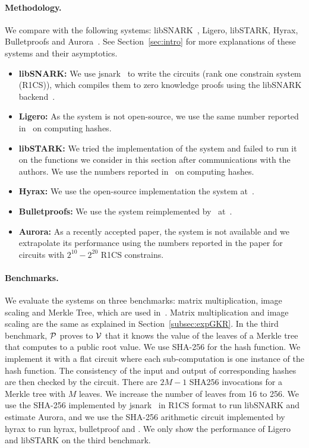 \paragraph{Methodology.} We compare with the following systems: libSNARK~\cite{libsnark}, Ligero\cite{ligero}, libSTARK\cite{libstark}, Hyrax\cite{hyrax},  Bulletproofs\cite{bulletproofs} and Aurora~\cite{}. See Section~\ref{sec:intro} for more explanations of these systems and their asymptotics. 
\begin{itemize}
\item \textbf{libSNARK:} We use jsnark~\cite{jsnark} to write the circuits (rank one constrain system (R1CS)), which compiles them to zero knowledge proofs using the libSNARK backend~\cite{??}. 

\item\textbf{Ligero:} As the system is not open-source, we use the same number reported in~\cite{ligero} on computing hashes.

\item\textbf{libSTARK:} We tried the implementation of the system and failed to run it on the functions we consider in this section after communications with the authors. We use the numbers reported in~\cite{libstark} on computing hashes. 

\item\textbf{Hyrax:} We use the open-source implementation the system at~\cite{??}.

\item\textbf{Bulletproofs:} We use the system reimplemented by~\cite{hyrax} at~\cite{??}.


\item\textbf{Aurora:} As a recently accepted paper, the system is not available and we extrapolate its performance using the numbers reported in the paper for circuits with $2^{10}-2^{20}$ R1CS constrains.

\end{itemize}


\paragraph{Benchmarks.} We evaluate the systems on three benchmarks: matrix multiplication, image scaling and Merkle Tree\cite{merkletree}, which are used in~\cite{hyrax}. Matrix multiplication and image scaling are the same as explained in Section~\ref{subsec:expGKR}. In the third benchmark, $\P$ proves to $\V$ that it knows the value of the leaves of a Merkle tree\cite{merkletree} that computes to a public root value\cite{blum1994checking}. We use SHA-256 for the hash function. We implement it with a flat circuit where each sub-computation is one instance of the hash function. The consistency of the input and output of corresponding hashes are then checked by the circuit. There are $2M - 1$ SHA256 invocations for a Merkle tree with $M$ leaves. We increase the number of leaves from 16 to 256. We use the SHA-256 implemented by jsnark~\cite{jsnark} in R1CS format to run libSNARK and estimate Aurora, and we use the SHA-256 arithmetic circuit implemented by hyrax to run hyrax, bulletproof and \name. We only show the performance of Ligero and libSTARK on the third benchmark.

